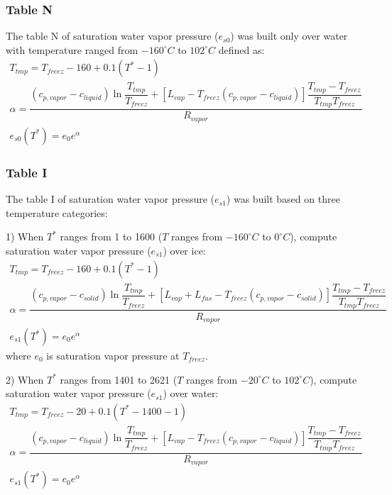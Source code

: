 \documentclass[letterpaper,titlepage,10pt]{article}
\numberwithin{equation}{section}
\begin{document}
\subsubsection*{Table N}

The table N of saturation water vapor pressure ($e_{s0}$) was built only over water with temperature ranged from $-160^\circ C$ to $102^\circ C$ defined as:
\begin{gather}
	T_{tmp} = T_{freez} - 160 + 0.1\left( T^* - 1 \right) \\
	\alpha = {\dfrac{\left(c_{p,vapor} - c_{liquid} \right) \ln \dfrac{T_{tmp}}{T_{freez}} + \left[L_{vap} - T_{freez} \left(c_{p,vapor} - c_{liquid} \right) \right] \dfrac{T_{tmp} - T_{freez}}{T_{tmp} T_{freez}}}{R_{vapor}}} \\
	e_{s0}(T^*) = e_0 e^{\alpha}
\end{gather}


\subsubsection*{Table I}

The table I of saturation water vapor pressure ($e_{s1}$) was built based on three temperature categories:

1) When $T^*$ ranges from 1 to 1600 ($T$ ranges from $-160^\circ C$ to $0^\circ C$), compute saturation water vapor pressure ($e_{s1}$) over ice:
\begin{gather}
	T_{tmp} = T_{freez} - 160 + 0.1\left( T^* - 1 \right) \\
	\alpha = {\dfrac{\left(c_{p,vapor} - c_{solid} \right) \ln \dfrac{T_{tmp}}{T_{freez}} + \left[L_{vap} + L_{fus} - T_{freez} \left(c_{p,vapor} - c_{solid} \right) \right] \dfrac{T_{tmp} - T_{freez}}{T_{tmp} T_{freez}}}{R_{vapor}}} \\
	e_{s1}(T^*) = e_0 e^{\alpha}
\end{gather}
where $e_0$ is saturation vapor pressure at $T_{freez}$.

2) When $T^*$ ranges from 1401 to 2621 ($T$ ranges from $-20^\circ C$ to $102^\circ C$), compute saturation water vapor pressure ($e_{s1}$) over water:
\begin{gather}
	T_{tmp} = T_{freez} - 20 + 0.1\left( T^* - 1400 - 1 \right) \\
	\alpha = {\dfrac{\left(c_{p,vapor} - c_{liquid} \right) \ln \dfrac{T_{tmp}}{T_{freez}} + \left[L_{vap} - T_{freez} \left(c_{p,vapor} - c_{liquid} \right) \right] \dfrac{T_{tmp} - T_{freez}}{T_{tmp} T_{freez}}}{R_{vapor}}} \\
	e_{s1}(T^*) = e_0 e^{\alpha}
\end{gather}
\end{document}
